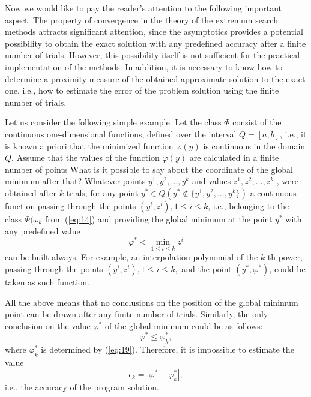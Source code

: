 Now we would like to pay the reader’s attention to the following important aspect. The property of convergence in the theory of the extremum search methods attracts significant attention, since the asymptotics provides a potential possibility to obtain the exact solution with any predefined accuracy after a finite number of trials. However, this possibility itself is not sufficient for the practical implementation of the methods. In addition, it is necessary to know how to determine a proximity measure of the obtained approximate solution to the exact one, i.e., how to estimate the error of the problem solution using the finite number of trials.

Let us consider the following simple example. Let the class $\Phi$ consist of the continuous one-dimensional functions, defined over the interval $Q=[a,b]$, i.e., it is known a priori that the minimized function $\varphi(y)$ is continuous in the domain $Q$. Assume that the values of the function $\varphi(y)$ are calculated in a finite number of points   What is it possible to say about the coordinate of the global minimum after that? Whatever points $y^1,y^2,\ldots,y^k$  and values $z^1,z^2,\ldots,z^k$ , were obtained after $k$  trials, for any point $y^*\in Q (y^*\notin \{y^1,y^2,\ldots,y^k\})$   a continuous function passing through the points $(y^i,z^i),1\leq i\leq k$,  i.e., belonging to the class $\Phi(\omega_k$ from (\ref{eq:14}) and providing the global minimum at the point $y^*$  with any predefined value
\begin{displaymath}
\varphi^*<\min_{1\leq i\leq k} z^i 
\end{displaymath}
can be built always. For example, an interpolation polynomial of the $k$-th power, passing through the points  $(y^i,z^i),1\leq i\leq k,$ and the point $(y^*,\varphi^*)$, could be taken as such function.

All the above means that no conclusions on the position of the global minimum point can be drawn after any  finite number of trials. Similarly, the only conclusion on the value $\varphi^*$  of the global minimum could be as follows:
\begin{displaymath}
\varphi^*\leq \varphi_k^*, 
\end{displaymath}
where $\varphi_k^*$  is determined by (\ref{eq:19}). Therefore, it is impossible to estimate the value 
\begin{displaymath}
\epsilon_k=\left|\varphi^*-\varphi_k^*\right|, 
\end{displaymath}
i.e., the accuracy of the program solution.

